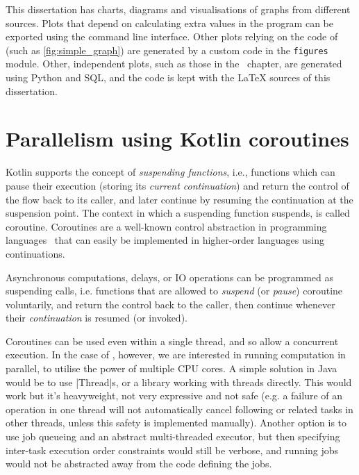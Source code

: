 This dissertation has charts, diagrams and visualisations of graphs from different sources.
Plots that depend on calculating extra values in the \graffs program can be exported using the command line interface.
Other plots relying on the code of \graffs (such as \cref{fig:simple_graph}) are generated by a custom code in the \texttt{figures} module.
Other, independent plots, such as those in the~ chapter, are generated using Python and SQL, and the code is kept with the LaTeX sources of this dissertation.


\section{Parallelism using Kotlin coroutines}\label{sec:kotlin_coroutines}

Kotlin supports the concept of \textsl{suspending functions}, i.e., functions which can pause their execution (storing its \textsl{current continuation}) and return the control of the flow back to its caller, and later continue by resuming the continuation at the suspension point.
The context in which a suspending function suspends, is called coroutine.
Coroutines are a well-known control abstraction in programming languages~\cite{MouraRevisitingCoroutines2009} that can easily be implemented in higher-order languages using continuations\cite{HaynesContinuationsCoroutines1984}.

Asynchronous computations, delays, or IO operations can be programmed as suspending calls, i.e. functions that are allowed to \textsl{suspend} (or \textsl{pause}) coroutine voluntarily, and return the control back to the caller, then continue whenever their \textsl{continuation} is resumed (or invoked).

Coroutines can be used even within a single thread, and so allow a concurrent execution.
In the case of \graffs, however, we are interested in running computation in parallel, to utilise the power of multiple CPU cores.
A simple solution in Java would be to use |Thread|s, or a library working with threads directly.
This would work but it's heavyweight, not very expressive and not safe (e.g. a failure of an operation in one thread will not automatically cancel following or related tasks in other threads, unless this safety is implemented manually).
Another option is to use job queueing and an abstract multi-threaded executor, but then specifying inter-task execution order constraints would still be verbose, and running jobs would not be abstracted away from the code defining the jobs.

